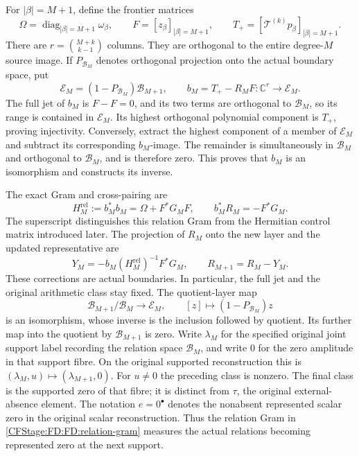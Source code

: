 For \(|\beta|=M+1\), define the frontier matrices
\begin{equation}
\Omega=\operatorname{diag}_{|\beta|=M+1}\omega_\beta,\qquad
F=[z_\beta]_{|\beta|=M+1},\qquad
T_+=[\mathcal T^{(k)}p_\beta]_{|\beta|=M+1}.
\tag{FD.11}\label{CFStage:FD:FD:frontier}
\end{equation}
There are \(r=\binom{M+k}{k-1}\) columns.  They are orthogonal to the
entire degree-\(M\) source image.  If \(P_{\mathcal B_M}\) denotes
orthogonal projection onto the actual boundary space, put
\begin{equation}
\mathcal E_M=(1-P_{\mathcal B_M})\mathcal B_{M+1},\qquad
b_M=T_+-R_MF:\mathbb C^r\longrightarrow\mathcal E_M.
\tag{FD.12}\label{CFStage:FD:FD:boundary-map}
\end{equation}
The full jet of \(b_M\) is \(F-F=0\), and its two terms are orthogonal
to \(\mathcal B_M\), so its range is contained in \(\mathcal E_M\).
Its highest orthogonal polynomial component is \(T_+\), proving
injectivity.  Conversely, extract the highest component of a member of
\(\mathcal E_M\) and subtract its corresponding \(b_M\)-image.  The
remainder is simultaneously in \(\mathcal B_M\) and orthogonal to
\(\mathcal B_M\), and is therefore zero.  This proves that \(b_M\) is
an isomorphism and constructs its inverse.

The exact Gram and cross-pairing are
\begin{equation}
H_M^{\mathrm{rel}}:=b_M^*b_M=\Omega+F^*G_MF,
\qquad b_M^*R_M=-F^*G_M.
\tag{FD.13}\label{CFStage:FD:FD:relation-gram}
\end{equation}
The superscript distinguishes this relation Gram from the Hermitian
control matrix introduced later.  The projection of \(R_M\) onto the
new layer and the updated representative are
\begin{equation}
Y_M=-b_M(H_M^{\mathrm{rel}})^{-1}F^*G_M,
\qquad R_{M+1}=R_M-Y_M.
\tag{FD.14}\label{CFStage:FD:FD:representative-update}
\end{equation}
These corrections are actual boundaries.  In particular, the full jet and
the original arithmetic class stay fixed.  The quotient-layer map
\[
\mathcal B_{M+1}/\mathcal B_M\longrightarrow\mathcal E_M,
\qquad [z]\longmapsto(1-P_{\mathcal B_M})z
\]
is an isomorphism, whose inverse is the inclusion followed by quotient.
Its further map into the quotient by \(\mathcal B_{M+1}\) is zero.
Write \(\lambda_M\) for the specified original joint support label
recording the relation space \(\mathcal B_M\), and write \(0\) for
the zero amplitude in that support fibre.  On the original supported
reconstruction this is
\((\lambda_M,u)\mapsto(\lambda_{M+1},0)\).  For \(u\ne0\) the preceding
class is nonzero.  The final class is the supported zero of that fibre;
it is distinct from \(\tau\), the original external-absence element.
The notation \(e=0^\bullet\) denotes the nonabsent represented scalar
zero in the original scalar reconstruction.  Thus the relation Gram
in \eqref{CFStage:FD:FD:relation-gram} measures the actual relations becoming
represented zero at the next support.

